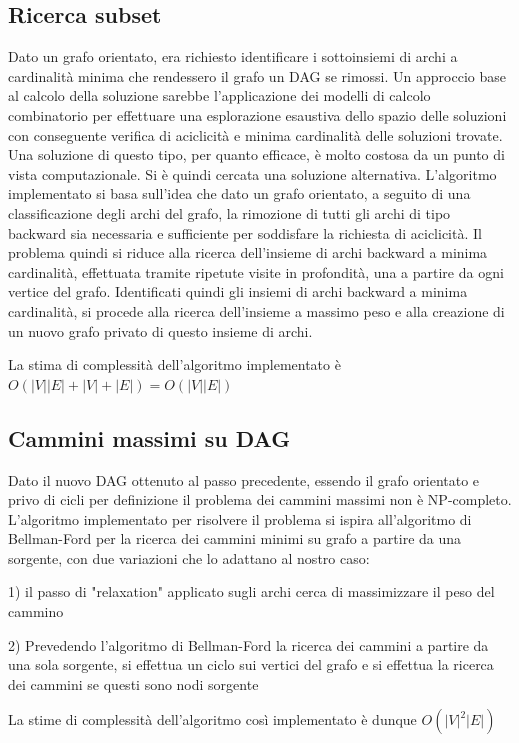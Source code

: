 \documentclass[11pt, a4paper, titlepage]{article}
\begin{document}
            \subsection{Ricerca subset}
                Dato un grafo orientato, era richiesto identificare i sottoinsiemi di archi a cardinalità minima che rendessero il grafo un DAG se rimossi.
                Un approccio base al calcolo della soluzione sarebbe l'applicazione dei modelli di calcolo combinatorio per effettuare una esplorazione esaustiva dello
                spazio delle soluzioni con conseguente verifica di aciclicità e minima cardinalità delle soluzioni trovate. Una soluzione di questo tipo, per quanto efficace,
                è molto costosa da un punto di vista computazionale. Si è quindi cercata una soluzione alternativa.
                L'algoritmo implementato si basa sull'idea che dato un grafo orientato, a seguito di una classificazione degli archi del grafo, la rimozione di tutti gli archi di
                tipo backward sia necessaria e sufficiente per soddisfare la richiesta di aciclicità. Il problema quindi si riduce alla ricerca dell'insieme di archi backward a minima cardinalità,
                effettuata tramite ripetute visite in profondità, una a partire da ogni vertice del grafo. Identificati quindi gli insiemi di archi backward a minima cardinalità, si procede alla
                ricerca dell'insieme a massimo peso e alla creazione di un nuovo grafo privato di questo insieme di archi.

                La stima di complessità dell'algoritmo implementato è 
                \begin{math}
                    O(|V| |E| + |V|+|E|) = O(|V| |E|)
                \end{math}
                

            \subsection{Cammini massimi su DAG}
                Dato il nuovo DAG ottenuto al passo precedente, essendo il grafo orientato e privo di cicli per definizione il problema dei cammini massimi non è NP-completo.
                L'algoritmo implementato per risolvere il problema si ispira all'algoritmo di Bellman-Ford per la ricerca dei cammini minimi su grafo a partire da una sorgente, con due variazioni
                che lo adattano al nostro caso: 
                
                1) il passo di "relaxation" applicato sugli archi cerca di massimizzare il peso del cammino
                
                2) Prevedendo l'algoritmo di Bellman-Ford la ricerca dei cammini a partire da una sola sorgente, si effettua un ciclo sui vertici del grafo e si effettua la ricerca dei cammini se questi sono nodi sorgente

                La stime di complessità dell'algoritmo così implementato è dunque 
                \begin{math}
                    O(|V|^2 |E|)
                \end{math}
\end{document}
